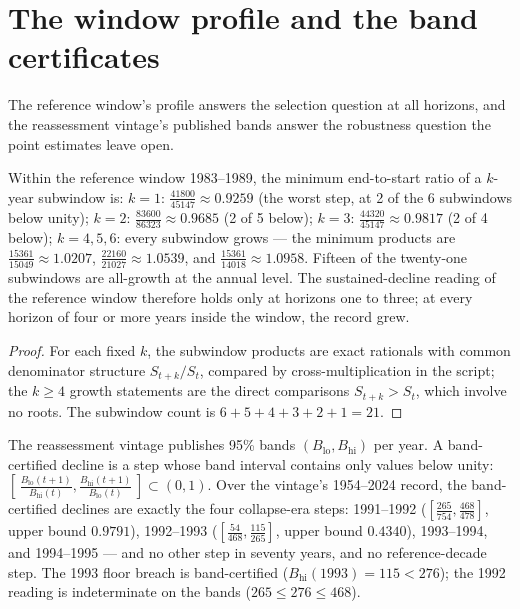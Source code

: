 \section{The window profile and the band certificates}\label{regime-profile}

The reference window's profile answers the selection question at all
horizons, and the reassessment vintage's published bands answer the
robustness question the point estimates leave open.

\begin{proposition}\label{regime-prop:profile}
Within the reference window 1983--1989, the minimum end-to-start ratio
of a \(k\)-year subwindow is: \(k=1\):
\(\tfrac{41800}{45147} \approx 0.9259\) (the worst step, at 2 of the 6
subwindows below unity); \(k=2\): \(\tfrac{83600}{86323} \approx
0.9685\) (2 of 5 below); \(k=3\): \(\tfrac{44320}{45147} \approx
0.9817\) (2 of 4 below); \(k = 4, 5, 6\): every subwindow grows ---
the minimum products are \(\tfrac{15361}{15049} \approx 1.0207\),
\(\tfrac{22160}{21027} \approx 1.0539\), and
\(\tfrac{15361}{14018} \approx 1.0958\). Fifteen of the twenty-one
subwindows are all-growth at the annual level. The sustained-decline
reading of the reference window therefore holds only at horizons one
to three; at every horizon of four or more years inside the window,
the record grew.
\end{proposition}

\begin{proof}
For each fixed \(k\), the subwindow products are exact rationals with
common denominator structure \(S_{t+k}/S_t\), compared by
cross-multiplication in the script; the \(k \ge 4\) growth statements
are the direct comparisons \(S_{t+k} > S_t\), which involve no roots.
The subwindow count is \(6+5+4+3+2+1 = 21\).
\end{proof}

\begin{proposition}
\label{regime-prop:bands}
The reassessment vintage publishes 95\% bands \((B_{\mathrm{lo}},
B_{\mathrm{hi}})\) per year. A band-certified decline is a step whose
band interval contains only values below unity:
\([\,\tfrac{B_{\mathrm{lo}}(t+1)}{B_{\mathrm{hi}}(t)},
\tfrac{B_{\mathrm{hi}}(t+1)}{B_{\mathrm{lo}}(t)}\,] \subset (0,1)\).
Over the vintage's 1954--2024 record, the band-certified declines are
exactly the four collapse-era steps: 1991--1992
(\([\tfrac{265}{754}, \tfrac{468}{478}]\), upper bound \(0.9791\)),
1992--1993 (\([\tfrac{54}{468}, \tfrac{115}{265}]\), upper bound
\(0.4340\)), 1993--1994, and 1994--1995 --- and no other step in
seventy years, and no reference-decade step. The 1993 floor breach is
band-certified (\(B_{\mathrm{hi}}(1993) = 115 < 276\)); the 1992
reading is indeterminate on the bands (\(265 \le 276 \le 468\)).
\end{proposition}

